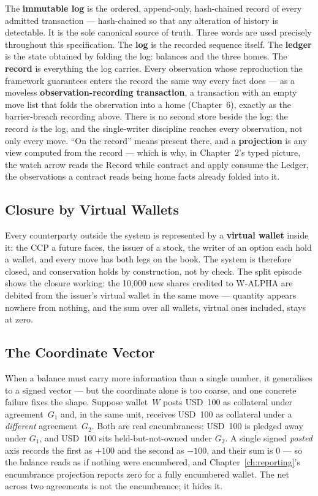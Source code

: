 \documentclass[11pt,a4paper]{article}
\newcommand{\USD}[1]{\mbox{USD~#1}}
\begin{document}
The \textbf{immutable log} is the ordered, append-only, hash-chained record of every
admitted transaction --- hash-chained so that any alteration of history is detectable.
It is the sole canonical source of truth. Three words are used precisely throughout this
specification. The \textbf{log} is the recorded sequence itself. The \textbf{ledger} is
the state obtained by folding the log: balances and the three homes. The \textbf{record}
is everything the log carries. Every observation whose reproduction the framework
guarantees enters the record the same way every fact does --- as a moveless
\textbf{observation-recording transaction}, a transaction with an empty move list that
folds the observation into a home (Chapter~6), exactly as the barrier-breach recording
above. There is no second store beside the log: the record \emph{is} the log, and the
single-writer discipline reaches every observation, not only every move. ``On the
record'' means present there, and a \textbf{projection} is any view computed from the
record --- which is why, in Chapter~2's typed picture, the watch arrow reads the Record
while contract and apply consume the Ledger, the observations a contract reads being home
facts already folded into it.

\subsection{Closure by Virtual Wallets}

Every counterparty outside the system is represented by a \textbf{virtual wallet} inside
it: the CCP a future faces, the issuer of a stock, the writer of an option each hold a
wallet, and every move has both legs on the book. The system is therefore closed, and
conservation holds by construction, not by check. The split episode shows the closure
working: the 10{,}000 new shares credited to W-ALPHA are debited from the issuer's
virtual wallet in the same move --- quantity appears nowhere from nothing, and the sum
over all wallets, virtual ones included, stays at zero.

\subsection{The Coordinate Vector}\label{sec:coordinate-vector}

When a balance must carry more information than a single number, it generalises to a
signed vector --- but the coordinate alone is too coarse, and one concrete failure fixes
the shape. Suppose wallet~$W$ posts \USD{100} as collateral under agreement~$G_1$ and,
in the same unit, receives \USD{100} as collateral under a \emph{different}
agreement~$G_2$. Both are real encumbrances: \USD{100} is pledged away under $G_1$, and
\USD{100} sits held-but-not-owned under $G_2$. A single signed \emph{posted} axis records
the first as $+100$ and the second as $-100$, and their sum is $0$ --- so the balance reads
as if nothing were encumbered, and Chapter~\ref{ch:reporting}'s encumbrance projection
reports zero for a fully encumbered wallet. The net across two agreements is not the
encumbrance; it hides it.
\end{document}
